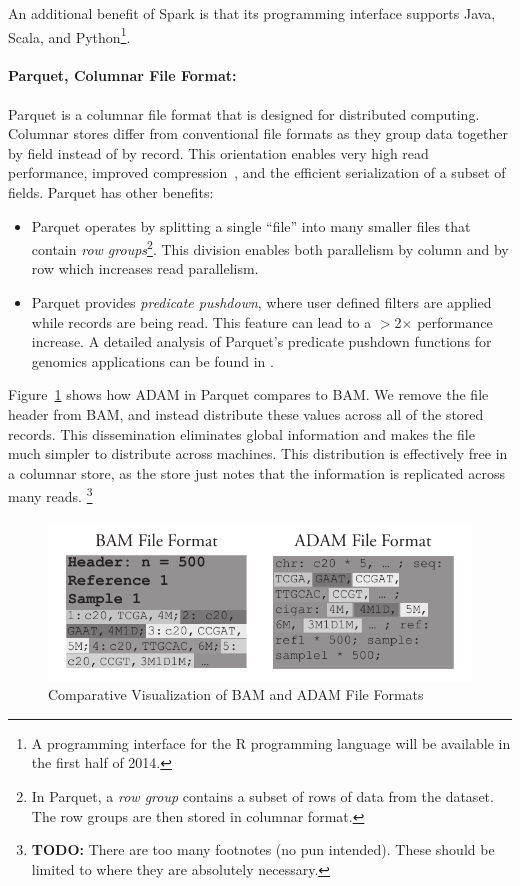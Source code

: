\documentclass{bioinfo}
\newcommand{\todo}[1]{\footnote{\textbf{TODO:} #1}}
\begin{document}
An additional benefit of Spark is that its programming interface supports Java, Scala, and Python\footnote{A programming interface for the R programming language will
be available in the first half of 2014.}.

\paragraph{Parquet, Columnar File Format:}
\label{sec:parquet}

Parquet is a columnar file format that is designed for distributed computing. Columnar stores differ from conventional file formats as they group data together
by field instead of by record. This orientation enables very high read performance, improved compression~\citep[see][]{abadi06}, and the efficient serialization of a subset
of fields. Parquet has other benefits:

\begin{itemize}
\item Parquet operates by splitting a single ``file'' into many smaller files that contain \emph{row groups}\footnote{In Parquet, a \emph{row group} contains a subset
of rows of data from the dataset. The row groups are then stored in columnar format.}. This division enables both parallelism by column and by row which increases read
parallelism.
\item Parquet provides \emph{predicate pushdown}, where user defined filters are applied while records are being read. This feature can lead to a $>$2$\times$ performance increase.
A detailed analysis of Parquet's predicate pushdown functions for genomics applications can be found in \citet{massie13}.
\end{itemize}

Figure~\ref{fig:file-format} shows how ADAM in Parquet compares to BAM. We remove the file header from BAM, and instead distribute these values across all of the stored
records. This dissemination eliminates global information and makes the file much simpler to distribute across machines. This distribution is effectively free in a columnar store,
as the store just notes that the information is replicated across many reads.
\todo{There are too many footnotes (no pun intended). These should be limited to where they are absolutely necessary.}

\begin{figure}[h]
\begin{center}
\includegraphics[width=\linewidth]{file-format.pdf}
\end{center}
\caption{Comparative Visualization of BAM and ADAM File Formats}
\label{fig:file-format}
\end{figure}
\end{document}
